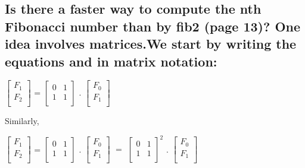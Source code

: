 \documentclass{article}
\begin{document}
\subsection*{ Is there a faster way to compute the nth Fibonacci number than by fib2 (page 13)? One idea involves matrices.We start by writing the equations and  in matrix notation:}
	\begin{center}
			$\begin{bmatrix}
				 F_{1}\\
				 F_{2}\\
				 
			\end{bmatrix}$
            =
            $\begin{bmatrix}
				 0&1\\
				 1&1\\ 
			\end{bmatrix}$
            .
            $\begin{bmatrix}
				 F_{0}\\
				 F_{1}\\ 
			\end{bmatrix}$
	\end{center}
Similarly, 
\begin{center}
			$\begin{bmatrix}
				 F_{1}\\
				 F_{2}\\
				 
			\end{bmatrix}$
            =
            $\begin{bmatrix}
				 0&1\\
				 1&1\\ 
			\end{bmatrix}$
            .
            $\begin{bmatrix}
				 F_{0}\\
				 F_{1}\\ 
			\end{bmatrix}$
            $=$
            $\begin{bmatrix}
           		 0&1\\
				 1&1\\
            \end{bmatrix}^2$
           .
           $\begin{bmatrix}
				 F_{0}\\
				 F_{1}\\ 
			\end{bmatrix}$
	\end{center}
\end{document}
